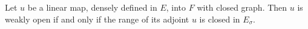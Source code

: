 Let $u$ be a linear map, densely defined in $E$, into $F$ with closed graph. Then $u$ is weakly open if and only if the range of its adjoint $u$ is closed in $E_\sigma$.